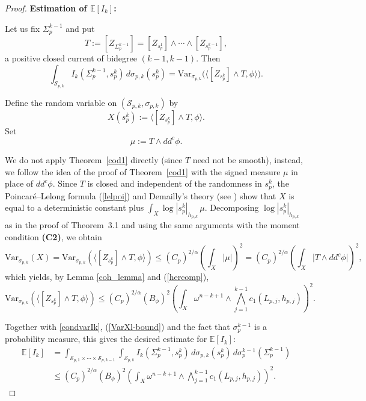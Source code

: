 \documentclass[11pt,leqno,oneside]{amsart}
\numberwithin{equation}{section}
\begin{document}
\begin{proof}
\noindent\textbf{Estimation of $\mathbb{E}[I_k]$:}

Let us fix $\Sigma_p^{k-1}$ and put
$$
T:=[Z_{\Sigma_p^{k-1}}]=[Z_{s_p^{1}}]\wedge\cdots\wedge [Z_{s_p^{k-1}}],
$$
a positive closed current of bidegree $(k-1,k-1)$.
Then
\begin{equation}\label{condvarIk}
\int_{\mathcal{S}_{p,k}} I_k(\Sigma_p^{k-1},s_p^{k})\,d\sigma_{p,k}(s_p^{k})
=
\mathrm{Var}_{\sigma_{p, k}}\Big(\big\langle [Z_{s_p^{k}}]\wedge T,\phi\big\rangle\Big).
\end{equation}



\smallskip

Define the random variable on $(\mathcal{S}_{p,k},\sigma_{p,k})$ by
$$
X(s_p^{k})
:=\big\langle [Z_{s_p^{k}}]\wedge T ,\phi\big\rangle .
$$
Set
$$
\mu:=T \wedge dd^c\phi.
$$


\smallskip


We do not apply Theorem~\ref{cod1} directly (since $T$ need not be smooth), instead,
we follow the idea of the proof of Theorem~\ref{cod1} with the signed measure
$\mu$ in place of $dd^c\phi$.
Since $T$ is closed and independent of the randomness in $s_p^k$, the Poincar\'e--Lelong formula (\ref{lelpoi}) and Demailly's theory (see \cite[Chapter III, Section 4]{Dem12}) show that $X$ is equal to a deterministic constant plus
$\int_X \log|s_p^k|_{h_{p,k}}\, \mu$.
Decomposing $\log|s_p^k|_{h_{p,k}}$ as in the proof of Theorem~3.1 and using the same arguments with the moment condition
\textbf{(C2)}, we obtain
\begin{equation}\label{cod1psi-ell}
\mathrm{Var}_{\sigma_{p,k}}\!(X)
=
\mathrm{Var}_{\sigma_{p,k}}\!\left(\big\langle [Z_{s_p^{k}}]\wedge T, \phi\big\rangle\right)
\le (C_p)^{2/\alpha}\left(\int_X |\mu|\right)^2
=
(C_p)^{2/\alpha}\left(\int_X \big|T \wedge dd^c\phi\big|\right)^2,
\end{equation} which yields, by Lemma \ref{coh_lemma} and (\ref{hercomp}),
\begin{equation}\label{VarXl-bound}
\mathrm{Var}_{\sigma_{p,k}}\!\left(\big\langle [Z_{s_p^{k}}]\wedge T,\phi\big\rangle\right)
\le (C_p)^{2/\alpha}(B_\phi)^{2}
\left(
\int_X \omega^{n-k+1}\wedge \bigwedge_{j=1}^{k-1}c_1(L_{p,j},h_{p,j})
\right)^{2}.
\end{equation}




Together with \eqref{condvarIk}, (\ref{VarXl-bound}) and the fact that $\sigma_p^{k-1}$ is a probability measure, this gives
the desired estimate for $\mathbb{E}[I_k]$:
\begin{equation}\label{eik}
\begin{aligned}
\mathbb{E}[I_k]
&=\int_{\mathcal{S}_{p,1}\times\cdots\times\mathcal{S}_{p,k-1}}
\int_{\mathcal{S}_{p,k}} I_k(\Sigma_p^{k-1},s_p^{k})\,d\sigma_{p,k}(s_p^{k})\,d\sigma_p^{k-1}(\Sigma_p^{k-1}) \\
&\le (C_p)^{2/\alpha}(B_\phi)^{2}
\left(\int_X \omega^{n-k+1}\wedge \bigwedge_{j=1}^{k-1}c_1(L_{p,j},h_{p,j})\right)^{2}.
\end{aligned}
\end{equation}


\end{proof}
\end{document}
